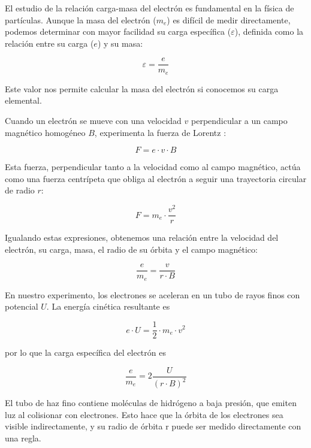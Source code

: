 \documentclass[twocolumn,a4paper,11pt]{scrartcl}
\begin{document}
El estudio de la relación carga-masa del electrón es fundamental en la física de partículas. Aunque la masa del electrón ($m_e$) es difícil de medir directamente, podemos determinar con mayor facilidad su carga específica ($\varepsilon$), definida como la relación entre su carga ($e$) y su masa:

\begin{equation}
\varepsilon = \frac{e}{m_e}
\end{equation}

Este valor nos permite calcular la masa del electrón si conocemos su carga elemental.

Cuando un electrón se mueve con una velocidad $v$ perpendicular a un campo magnético homogéneo $B$, experimenta la fuerza de Lorentz \cite{serway2018}:

\begin{equation}
F = e \cdot v \cdot B
\end{equation}

Esta fuerza, perpendicular tanto a la velocidad como al campo magnético, actúa como una fuerza centrípeta que obliga al electrón a seguir una trayectoria circular de radio $r$:

\begin{equation}
F = m_e \cdot \frac{v^2}{r}
\end{equation}

Igualando estas expresiones, obtenemos una relación entre la velocidad del electrón, su carga, masa, el radio de su órbita y el campo magnético:

\begin{equation}
\frac{e}{m_e} = \frac{v}{r \cdot B}
\end{equation}

En nuestro experimento, los electrones se aceleran en un tubo de rayos finos con potencial $U$. La energía cinética resultante es

\begin{equation}
    e \cdot U = \frac{1}{2} \cdot m_e \cdot v^2
\end{equation}

por lo que la carga específica del electrón es

\begin{equation}
\frac{e}{m_e} = 2 \frac{U}{(r \cdot B)^2}
\end{equation}

El tubo de haz fino contiene moléculas de hidrógeno a baja presión, que emiten luz al colisionar con electrones. Esto hace que la órbita de los electrones sea visible indirectamente, y su radio de órbita r puede ser medido directamente con una regla.
\end{document}
